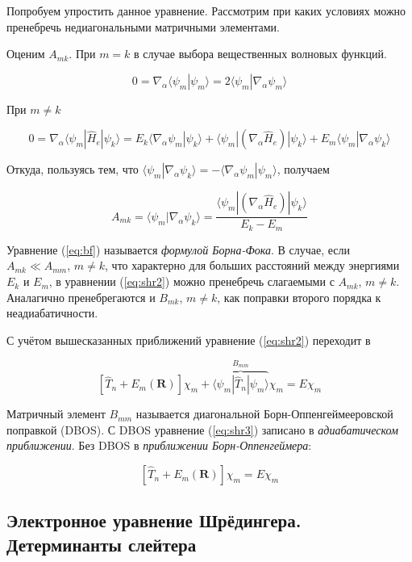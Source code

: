 \documentclass[12pt, oneside]{article}
\numberwithin{equation}{section}  %
\begin{document}
Попробуем упростить данное уравнение. Рассмотрим при каких условиях можно пренебречь недиагональными матричными элементами.

Оценим \(A_{mk}\). При \(m = k\) в случае выбора вещественных волновых функций.

\[0 = \nabla_\alpha \langle \psi_m | \psi_m \rangle = 2 \langle \psi_m | \nabla_\alpha \psi_m \rangle\]

При \(m \neq k\)

\[0 = \nabla_\alpha \langle \psi_m | \hat{H}_e| \psi_k \rangle = E_k \langle \nabla_\alpha \psi_m | \psi_k \rangle + \langle \psi_m | (\nabla_\alpha \hat{H}_e) | \psi_k \rangle + E_m \langle \psi_m | \nabla_\alpha \psi_k \rangle \]

Откуда, пользуясь тем, что \(\langle \psi_m | \nabla_\alpha \psi_k \rangle = - \langle \nabla_\alpha \psi_m | \psi_m \rangle\), получаем

\begin{equation}
    A_{mk} = \langle \psi_m | \nabla_\alpha \psi_k \rangle = \dfrac{\langle \psi_m | (\nabla_\alpha \hat{H}_e )| \psi_k \rangle}{E_k - E_m}
    \label{eq:bf}
\end{equation}

Уравнение (\ref{eq:bf}) называется \textit{формулой Борна-Фока}. В случае, если \(A_{mk} \ll A_{mm}\), \(m \neq k\), что характерно для больших расстояний между энергиями \(E_k\) и \(E_m\), в уравнении (\ref{eq:shr2}) можно пренебречь слагаемыми с \(A_{mk}\), \(m \neq k\). Аналагично пренебрегаются и \(B_{mk}\), \(m \neq k\), как поправки второго порядка к неадиабатичности.

С учётом вышесказанных приближений уравнение (\ref{eq:shr2}) переходит в

\begin{equation}
    \left[ \hat{T}_n + E_m (\bm{R}) \right] \chi_m + \overbrace{\langle \psi_m | \hat{T}_n | \psi_m \rangle}^{B_{mm}} \chi_m = E \chi_m
    \label{eq:shr3}
\end{equation}

Матричный элемент \(B_{mm}\) называется диагональной Борн-Оппенгеймееровской поправкой (DBOS).
С DBOS уравнение (\ref{eq:shr3}) записано в \textit{адиабатическом приближении}. Без DBOS в \textit{приближении Борн-Оппенгеймера}:

\begin{equation}
    \left[ \hat{T}_n + E_m (\bm{R}) \right] \chi_m = E \chi_m
\end{equation}

\subsection{Электронное уравнение Шрёдингера. Детерминанты слейтера}
\end{document}
